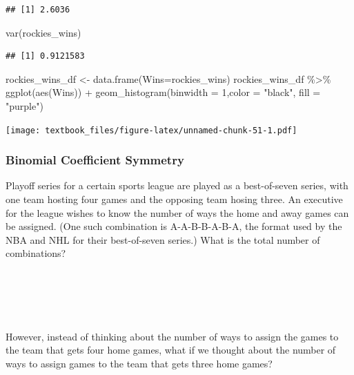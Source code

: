 \documentclass[
  11pt,
]{book}
\newenvironment{Shaded}{\begin{snugshade}}{\end{snugshade}}
\newcommand{\AttributeTok}[1]{\textcolor[rgb]{0.77,0.63,0.00}{#1}}
\newcommand{\DecValTok}[1]{\textcolor[rgb]{0.00,0.00,0.81}{#1}}
\newcommand{\FunctionTok}[1]{\textcolor[rgb]{0.00,0.00,0.00}{#1}}
\newcommand{\NormalTok}[1]{#1}
\newcommand{\OtherTok}[1]{\textcolor[rgb]{0.56,0.35,0.01}{#1}}
\newcommand{\SpecialCharTok}[1]{\textcolor[rgb]{0.00,0.00,0.00}{#1}}
\newcommand{\StringTok}[1]{\textcolor[rgb]{0.31,0.60,0.02}{#1}}
\theoremstyle{definition}
\theoremstyle{definition}
\theoremstyle{definition}
\theoremstyle{definition}
\theoremstyle{remark}
\begin{document}
\begin{verbatim}
## [1] 2.6036
\end{verbatim}

\begin{Shaded}
\begin{Highlighting}[]
\FunctionTok{var}\NormalTok{(rockies\_wins)}
\end{Highlighting}
\end{Shaded}

\begin{verbatim}
## [1] 0.9121583
\end{verbatim}

\begin{Shaded}
\begin{Highlighting}[]
\NormalTok{rockies\_wins\_df }\OtherTok{\textless{}{-}} \FunctionTok{data.frame}\NormalTok{(}\AttributeTok{Wins=}\NormalTok{rockies\_wins)}
\NormalTok{rockies\_wins\_df }\SpecialCharTok{\%\textgreater{}\%} \FunctionTok{ggplot}\NormalTok{(}\FunctionTok{aes}\NormalTok{(Wins)) }\SpecialCharTok{+} \FunctionTok{geom\_histogram}\NormalTok{(}\AttributeTok{binwidth =} \DecValTok{1}\NormalTok{,}\AttributeTok{color =} \StringTok{"black"}\NormalTok{, }\AttributeTok{fill =} \StringTok{"purple"}\NormalTok{)}
\end{Highlighting}
\end{Shaded}

\texttt{[image: textbook\_files/figure-latex/unnamed-chunk-51-1.pdf]}

\newpage

\hypertarget{binomial-coefficient-symmetry}{%
\subsubsection{Binomial Coefficient Symmetry}\label{binomial-coefficient-symmetry}}

Playoff series for a certain sports league are played as a best-of-seven series, with one team hosting four games and the opposing team hosing three. An executive for the league wishes to know the number of ways the home and away games can be assigned. (One such combination is A-A-B-B-A-B-A, the format used by the NBA and NHL for their best-of-seven series.) What is the total number of combinations?\\
\strut \\
\strut \\
\strut \\

However, instead of thinking about the number of ways to assign the games to the team that gets four home games, what if we thought about the number of ways to assign games to the team that gets three home games?
\end{document}
